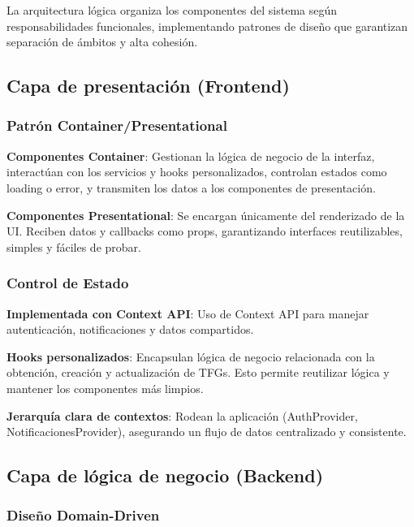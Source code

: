 \documentclass[12pt,a4paper,oneside]{report}
\begin{document}
La arquitectura lógica organiza los componentes del sistema según
responsabilidades funcionales, implementando patrones de diseño que
garantizan separación de ámbitos y alta cohesión.

\subsection{Capa de presentación
(Frontend)}\label{capa-de-presentaciuxf3n-frontend}

\subsubsection{Patrón Container/Presentational}\label{patruxf3n-containerpresentational}

\textbf{Componentes Container}: Gestionan la lógica de negocio de la interfaz, interactúan con los servicios y hooks personalizados, controlan estados como loading o error, y transmiten los datos a los componentes de presentación.

\textbf{Componentes Presentational}: Se encargan únicamente del renderizado de la UI. Reciben datos y callbacks como props, garantizando interfaces reutilizables, simples y fáciles de probar.

\subsubsection{Control de Estado}\label{state-management-pattern}

\textbf{Implementada con Context API}: Uso de Context API para manejar autenticación, notificaciones y datos compartidos.

\textbf{Hooks personalizados}: Encapsulan lógica de negocio relacionada con la obtención, creación y actualización de TFGs. Esto permite reutilizar lógica y mantener los componentes más limpios.

\textbf{Jerarquía clara de contextos}: Rodean la aplicación (AuthProvider, NotificacionesProvider), asegurando un flujo de datos centralizado y consistente.

\subsection{Capa de lógica de negocio
(Backend)}\label{capa-de-luxf3gica-de-negocio-backend}

\subsubsection{Diseño Domain-Driven}\label{domain-driven-design}
\end{document}
